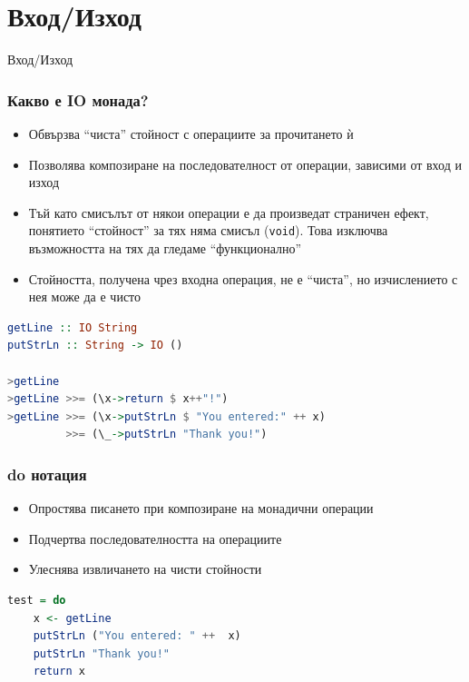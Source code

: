 \documentclass{beamer}
\begin{document}
\section{Вход/Изход}
\begin{frame}
  \centerline{Вход/Изход}
\end{frame}


\begin{frame}[fragile]
  \frametitle{Какво е IO монада?}


\begin{itemize}
  \footnotesize
  \item Обвързва ``чиста'' стойност с операциите за прочитането ѝ
  \item Позволява композиране на последователност от операции, зависими от вход и изход
  \item Тъй като смисълът от някои операции е да произведат страничен ефект, понятието ``стойност'' за тях няма смисъл (\texttt{void}). Това изключва възможността на тях да гледаме ``функционално''
  \item Стойността, получена чрез входна операция, не е ``чиста'', но изчислението с нея може да е чисто
\end{itemize}


\begin{lstlisting}[language=Haskell,basicstyle=\small\ttfamily]
getLine :: IO String
putStrLn :: String -> IO ()

>getLine
>getLine >>= (\x->return $ x++"!")
>getLine >>= (\x->putStrLn $ "You entered:" ++ x) 
         >>= (\_->putStrLn "Thank you!")
\end{lstlisting}


  
\end{frame}


\begin{frame}[fragile]
  \frametitle{do нотация}
\begin{itemize}
  \item Опростява писането при композиране на монадични операции
  \item Подчертва последователността на операциите
  \item Улеснява извличането на чисти стойности
\end{itemize}
\begin{lstlisting}[language=Haskell]
test = do 
    x <- getLine
    putStrLn ("You entered: " ++  x)
    putStrLn "Thank you!"
    return x
\end{lstlisting}
\end{frame}
\end{document}
